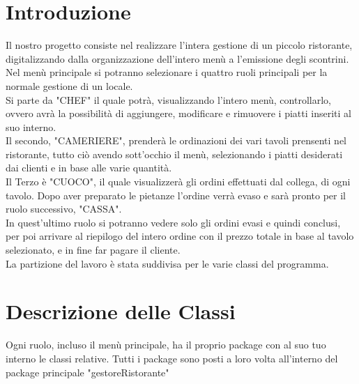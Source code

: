 \documentclass{FR16}
\begin{document}
\maketitle

\tableofcontents
\newpage

\section{Introduzione}
Il nostro progetto consiste nel realizzare l'intera gestione di un piccolo ristorante, digitalizzando dalla organizzazione dell'intero menù a l'emissione degli scontrini. \\
Nel menù principale si potranno selezionare i quattro ruoli principali per la normale gestione di un locale.\\
Si parte da "CHEF" il quale potrà, visualizzando l'intero menù, controllarlo, ovvero avrà la possibilità di aggiungere, modificare e rimuovere i piatti inseriti al suo interno. \\
Il secondo, "CAMERIERE", prenderà le ordinazioni dei vari tavoli prensenti nel ristorante, tutto ciò avendo sott'occhio il menù, selezionando i piatti desiderati dai clienti e in base alle varie quantità.\\
Il Terzo è "CUOCO", il quale visualizzerà gli ordini effettuati dal collega, di ogni tavolo. Dopo aver preparato le pietanze l'ordine verrà evaso e sarà pronto per il ruolo successivo, "CASSA".\\ 
In quest'ultimo ruolo si potranno vedere solo gli ordini evasi e quindi conclusi, per poi arrivare al riepilogo del intero ordine con il prezzo totale in base al tavolo selezionato, e in fine far pagare il cliente.\\
La partizione del lavoro è stata suddivisa per le varie classi del programma.
\newpage

\section{Descrizione delle Classi}
Ogni ruolo, incluso il menù principale, ha il proprio package con al suo tuo interno le classi relative. Tutti i package sono posti a loro volta all'interno del package principale "gestoreRistorante"
\end{document}
